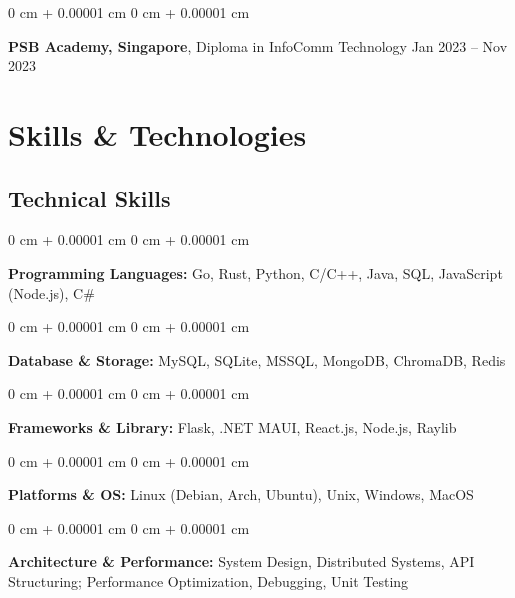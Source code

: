\documentclass[10pt, letterpaper]{article}
\newenvironment{onecolentry}{
    \begin{adjustwidth}{
        0 cm + 0.00001 cm
    }{
        0 cm + 0.00001 cm
    }
}{
    \end{adjustwidth}
} %
\newenvironment{twocolentry}[2][]{
    \onecolentry
    \def\secondColumn{#2}
    \setcolumnwidth{\fill, 4.5 cm}
    \begin{paracol}{2}
}{
    \switchcolumn \raggedleft \secondColumn
    \end{paracol}
    \endonecolentry
} %
\begin{document}
        \vspace{0.20 cm}
        \begin{twocolentry}{
                Jan 2023 – Nov 2023
            }
            \textbf{PSB Academy, Singapore}, Diploma in InfoComm Technology\end{twocolentry}


        \section{Skills \& Technologies}
        
        \subsection*{Technical Skills}
        \begin{onecolentry}
            \textbf{Programming Languages:} Go, Rust, Python, C/C++, Java, SQL, JavaScript (Node.js), C\# 
        \end{onecolentry}
        
        \vspace{0.1 cm}
        
        \begin{onecolentry}
            \textbf{Database \& Storage:} MySQL, SQLite, MSSQL, MongoDB, ChromaDB, Redis
        \end{onecolentry}
        
        \vspace{0.1 cm}
        
        \begin{onecolentry}
            \textbf{Frameworks \& Library:} Flask, .NET MAUI, React.js, Node.js, Raylib
        \end{onecolentry}
        
        \vspace{0.1 cm}
        
        \begin{onecolentry}
            \textbf{Platforms \& OS:} Linux (Debian, Arch, Ubuntu), Unix, Windows, MacOS
        \end{onecolentry}
        
        \vspace{0.1 cm}
        
        \begin{onecolentry}
            \textbf{Architecture \& Performance:} System Design, Distributed Systems, API Structuring; Performance Optimization, Debugging, Unit Testing
        \end{onecolentry}
        
\end{document}
